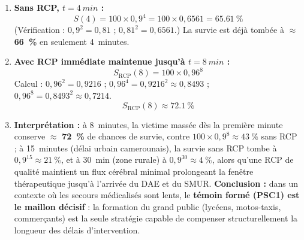 \documentclass[11pt]{article}
\begin{document}
\begin{corrige}
\begin{enumerate}
    \item \textbf{Sans RCP, $t = \SI{4}{min}$ :}
    \[ S(4) = 100 \times 0{,}9^4 = 100 \times 0{,}6561 = \SI{65,61}{\%} \]
    (Vérification : $0{,}9^2 = 0{,}81$ ; $0{,}81^2 = 0{,}6561$.) La survie est déjà tombée à $\approx$ \textbf{\SI{66}{\%}} en seulement \SI{4}{minutes}.
    \item \textbf{Avec RCP immédiate maintenue jusqu'à $t = \SI{8}{min}$ :}
    \[ S_{\text{RCP}}(8) = 100 \times 0{,}96^8 \]
    Calcul : $0{,}96^2 = 0{,}9216$ ; $0{,}96^4 = 0{,}9216^2 \approx 0{,}8493$ ; $0{,}96^8 = 0{,}8493^2 \approx 0{,}7214$.
    \[ S_{\text{RCP}}(8) \approx \SI{72,1}{\%} \]
    \item \textbf{Interprétation :} à \SI{8}{minutes}, la victime massée dès la première minute conserve $\approx$ \textbf{\SI{72}{\%}} de chances de survie, contre $100 \times 0{,}9^8 \approx \SI{43}{\%}$ sans RCP ; à \SI{15}{minutes} (délai urbain camerounais), la survie sans RCP tombe à $0{,}9^{15} \approx \SI{21}{\%}$, et à \SI{30}{min} (zone rurale) à $0{,}9^{30} \approx \SI{4}{\%}$, alors qu'une RCP de qualité maintient un flux cérébral minimal prolongeant la fenêtre thérapeutique jusqu'à l'arrivée du DAE et du SMUR. \textbf{Conclusion :} dans un contexte où les secours médicalisés sont lents, le \textbf{témoin formé (PSC1) est le maillon décisif} : la formation du grand public (lycéens, motos-taxis, commerçants) est la seule stratégie capable de compenser structurellement la longueur des délais d'intervention.
\end{enumerate}
\end{corrige}
\end{document}
